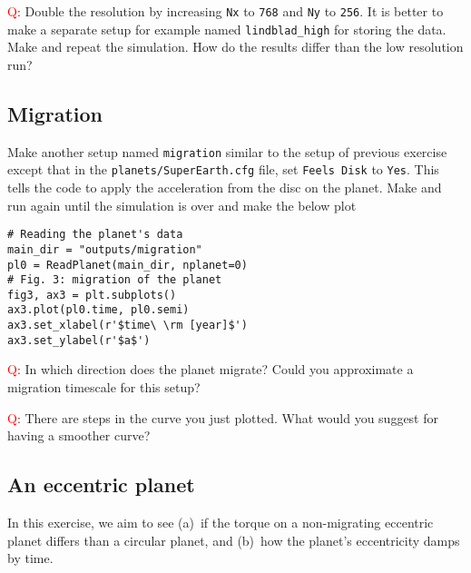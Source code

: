 \documentclass[14pt]{scrartcl}
\begin{document}
\textcolor{red}{Q}: Double the resolution by increasing \texttt{Nx} to \texttt{768} and \texttt{Ny} to \texttt{256}. It is better to make a separate setup for example named \texttt{lindblad\_high} for storing the data. Make and repeat the simulation. How do the results differ than the low resolution run?

\subsection{Migration} \label{subsec:migrating}	
Make another setup named \texttt{migration} similar to the setup of previous exercise except that in the \texttt{planets/SuperEarth.cfg} file, set \texttt{Feels Disk} to \texttt{Yes}. This tells the code to apply the acceleration from the disc on the planet. Make and run again until the simulation is over and make the below plot
\begin{verbatim}
# Reading the planet's data
main_dir = "outputs/migration"
pl0 = ReadPlanet(main_dir, nplanet=0)
# Fig. 3: migration of the planet
fig3, ax3 = plt.subplots()
ax3.plot(pl0.time, pl0.semi)
ax3.set_xlabel(r'$time\ \rm [year]$')
ax3.set_ylabel(r'$a$')
\end{verbatim}

\textcolor{red}{Q}: In which direction does the planet migrate? Could you approximate a migration timescale for this setup?

\textcolor{red}{Q}: There are steps in the curve you just plotted. What would you suggest for having a smoother curve?

\subsection{An eccentric planet} \label{subsec:ecc}	
In this exercise, we aim to see (a)~if the torque on a non-migrating eccentric planet differs than a circular planet, and (b)~how the planet's eccentricity damps by time.
\end{document}
